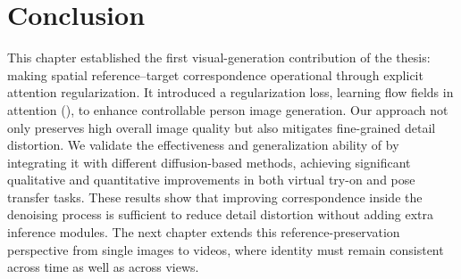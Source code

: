 \section{Conclusion}
\label{leffa:sec:conclusion}
This chapter established the first visual-generation contribution of the thesis: making spatial reference--target correspondence operational through explicit attention regularization.
It introduced a regularization loss, learning flow fields in attention (\leffa{}), to enhance controllable person image generation.
Our approach not only preserves high overall image quality but also mitigates fine-grained detail distortion.
We validate the effectiveness and generalization ability of \leffa{} by integrating it with different diffusion-based methods, achieving significant qualitative and quantitative improvements in both virtual try-on and pose transfer tasks.
These results show that improving correspondence inside the denoising process is sufficient to reduce detail distortion without adding extra inference modules.
The next chapter extends this reference-preservation perspective from single images to videos, where identity must remain consistent across time as well as across views.

